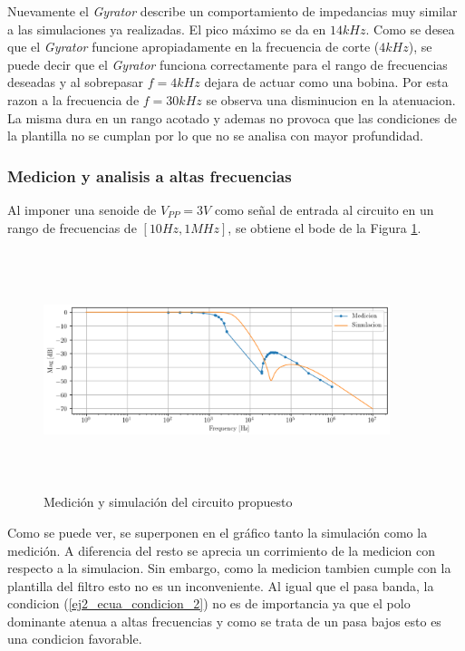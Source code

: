 \documentclass[12pt,a4paper]{article}
\begin{document}
Nuevamente el \textit{Gyrator} describe un comportamiento de impedancias muy similar a las simulaciones ya realizadas. El pico máximo se da en $14 kHz$. Como se desea que el \textit{Gyrator} funcione apropiadamente en la frecuencia de corte ($4kHz$), se puede decir que el 
\textit{Gyrator} funciona correctamente para el rango de frecuencias deseadas y al sobrepasar $f = 4 kHz$ dejara de actuar como una bobina. Por esta razon a la frecuencia de $f=30kHz$ se observa una disminucion en la atenuacion. La misma dura en un rango acotado y ademas no provoca que las condiciones de la plantilla no se cumplan por lo que no se analisa con mayor profundidad. 


\subsubsection{Medicion y analisis a altas frecuencias}

Al imponer una senoide de $V_{PP} = 3V$ como señal de entrada al circuito en un rango de frecuencias de $[10Hz , 1MHz]$, se obtiene el bode de la Figura \ref{fig:ej2_lp_medicion}.

\begin{figure}[h!]                                                       
\centering\includegraphics[width=0.9\textwidth, height=7cm]{Resources/ej2_lp_med_and_sim.png}
\caption{Medición y simulación del circuito propuesto }
\label{fig:ej2_lp_medicion}
\end{figure}

Como se puede ver, se superponen en el gráfico tanto la simulación como la medición. A diferencia del resto se aprecia un corrimiento de la medicion con respecto a la simulacion. Sin embargo, como la medicion tambien cumple con la plantilla del filtro esto no es un inconveniente. Al igual que el pasa banda, la condicion (\ref{ej2_ecua_condicion_2}) no es de importancia ya que el polo dominante atenua a altas frecuencias y como se trata de un pasa bajos esto es una condicion favorable. 
\end{document}
